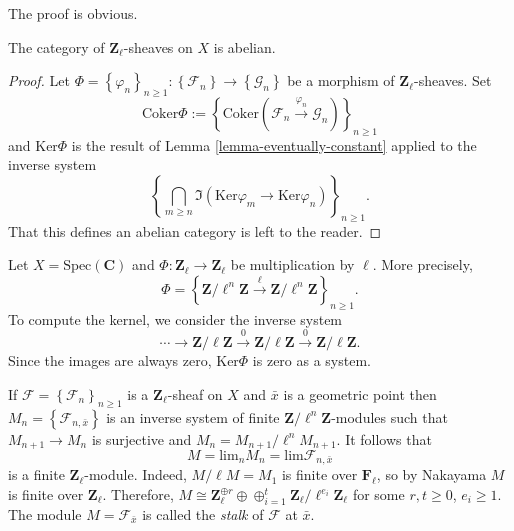 \noindent
The proof is obvious.

\begin{lemma}
\label{lemma-l-adic-abelian}
The category of $\mathbf{Z}_\ell$-sheaves on $X$ is abelian.
\end{lemma}

\begin{proof}
Let $\Phi=\left\{\varphi_n\right\}_{n\geq 1}: \left\{\mathcal{F}_n\right\}\to
\left\{\mathcal{G}_n\right\}$ be a morphism of $\mathbf{Z}_\ell$-sheaves. Set
$$
\text{Coker} \Phi := \left\{
\text{Coker}\left(\mathcal{F}_n\xrightarrow{\varphi_n}
\mathcal{G}_n\right)\right\}_{n\geq 1}
$$
and $\text{Ker}\Phi$ is the result of
Lemma \ref{lemma-eventually-constant}
applied to the inverse system
$$
\left\{\bigcap_{m\geq n} \Im \left( \text{Ker} \varphi_m \to \text{Ker}
\varphi_n \right)\right\}_{n\geq 1}.
$$
That this defines an abelian category is left to the reader.
\end{proof}

\begin{example}
\label{example-kernel}
Let $X=\text{Spec}(\mathbf{C})$ and $\Phi : \mathbf{Z}_\ell\to \mathbf{Z}_\ell$
be multiplication by $\ell$. More precisely,
$$
\Phi = \left\{ \mathbf{Z}/\ell^n\mathbf{Z} \xrightarrow{\ell}
\mathbf{Z}/\ell^n\mathbf{Z}\right\}_{n \geq 1}.
$$
To compute the kernel, we consider the inverse system
$$
\cdots\to \mathbf{Z}/\ell\mathbf{Z}\xrightarrow{0}
\mathbf{Z}/\ell\mathbf{Z}\xrightarrow{0}\mathbf{Z}/\ell\mathbf{Z}.
$$
Since the images are always zero, $\text{Ker} \Phi$ is zero as a system.
\end{example}

\begin{remark}
\label{remark-stalk-l-adic-sheaf}
If $\mathcal{F} = \left\{\mathcal{F}_n\right\}_{n\geq 1}$ is a
$\mathbf{Z}_\ell$-sheaf on $X$ and $\bar x$ is a geometric point then
$M_n=\left\{\mathcal{F}_{n, \bar x}\right\}$ is an inverse system of finite
$\mathbf{Z}/\ell^n\mathbf{Z}$-modules such that $M_{n+1}\to M_n$ is surjective
and $M_n = M_{n+1}/\ell^n M_{n+1}$. It follows that
$$
M = \text{lim}_n M_n = \text{lim} \mathcal{F}_{n, \bar x}
$$
is a finite $\mathbf{Z}_\ell$-module. Indeed, $M/\ell M= M_1$ is finite over
$\mathbf{F}_\ell$, so by Nakayama $M$ is finite over $\mathbf{Z}_\ell$.
Therefore, $M\cong \mathbf{Z}_\ell^{\oplus r} \oplus \oplus_{i=1}^t
\mathbf{Z}_\ell/\ell^{e_i}\mathbf{Z}_\ell$ for some $r, t\geq 0$, $e_i\geq 1$.
The module $M = \mathcal{F}_{\bar x}$ is called the {\it stalk} of
$\mathcal{F}$ at $\bar x$.
\end{remark}

